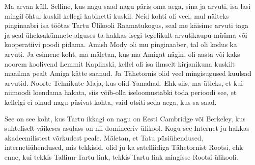 
Ma arvan küll. Selline, kus nagu saad nagu päris oma aega, sina ja arvuti, isa lasi  mingil õhtul kuskil kellegi kabinetti kuskil. Neid kohti oli veel, mul näiteks pinginaabri isa töötas Tartu Ülikooli Raamatukogus, seal me käisime arvuti taga ja seal üheksakümnete alguses ta hakkas isegi tegelikult arvutikaupu müüma või kooperatiivi poodi pidama. Amish Mody oli mu pinginaaber, tal oli kodus ka arvuti. Ja esimene koht, ma mäletan, kus ma Amigat nägin, oli aasta või kaks noorem koolivend Lemmit Kaplinski, kellel oli isa ilmselt  kirjanikuna kuskilt maailma pealt Amiga kätte saanud. Ja Tähetornis olid veel mingisugused  kuulsad arvutid. Noorte Tehnikute Maja, kus olid Yamahad. Ehk siis, ma ütleks, et kui niimoodi loendama hakata, siis võib-olla iseloomustabki toda perioodi see, et kellelgi ei olnud nagu püsivat kohta, vaid otsiti seda aega, kus sa saad.


See on see koht, kus Tartu ikkagi on nagu on Eesti Cambridge või Berkeley, kus suhteliselt väikeses asulass on nii domineeriv ülikool. Kogu see Internet ju hakkas akadeemilistest võrkudest peale. Mäletan, et  Tatu püsiühendused, internetiühendused, mis tekkisid, olid ju ka  satelliidiga Tähetornist Rootsi, ehk enne, kui tekkis Tallinn-Tartu link, tekkis Tartu link mingisse Rootsi ülikooli. 


